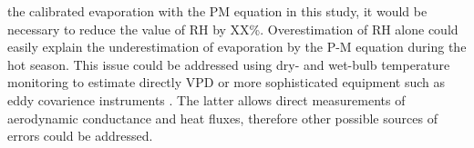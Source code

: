 \documentclass[a4paper,12pt]{article}
\begin{document}
\begin{linenumbers}
the calibrated evaporation with the PM equation in this study, it would be necessary to reduce the value of RH by XX\%. Overestimation of RH alone could easily explain the underestimation of evaporation by the P-M equation during the hot season. This issue could be addressed using dry- and wet-bulb temperature monitoring to estimate directly VPD \citep{Holwerdaetal2006, Holwerdaetal2010} or more sophisticated equipment such as eddy covarience instruments \citep{Holwerdaetal2012}. The latter allows direct measurements of aerodynamic conductance and heat fluxes, therefore other possible sources of errors could be addressed.



\end{linenumbers}
\end{document}
